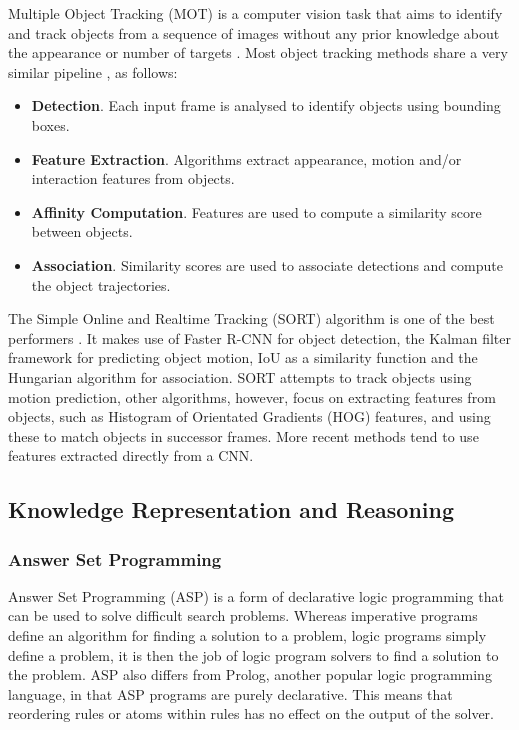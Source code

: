 \documentclass[../interim.tex]{subfiles}
\begin{document}
Multiple Object Tracking (MOT) is a computer vision task that aims to identify and track objects from a sequence of images without any prior knowledge about the appearance or number of targets \cite{obj-tracking-survey}. Most object tracking methods share a very similar pipeline \cite{obj-tracking-survey}, as follows:
\begin{itemize}
  \item \textbf{Detection}. Each input frame is analysed to identify objects using bounding boxes.

  \item \textbf{Feature Extraction}. Algorithms extract appearance, motion and/or interaction features from objects.

  \item \textbf{Affinity Computation}. Features are used to compute a similarity score between objects.

  \item \textbf{Association}. Similarity scores are used to associate detections and compute the object trajectories.
\end{itemize}

The Simple Online and Realtime Tracking (SORT) \cite{sort-obj-tracking} algorithm is one of the best performers \cite{obj-tracking-survey}. It makes use of Faster R-CNN for object detection, the Kalman filter \cite{kalman-filter} framework for predicting object motion, IoU as a similarity function and the Hungarian algorithm \cite{hungarian-algo} for association. SORT attempts to track objects using motion prediction, other algorithms, however, focus on extracting features from objects, such as Histogram of Orientated Gradients (HOG) \cite{hog-features} features, and using these to match objects in successor frames. More recent methods tend to use features extracted directly from a CNN.


\subsection{Knowledge Representation and Reasoning}

\subsubsection{Answer Set Programming}

Answer Set Programming (ASP) is a form of declarative logic programming that can be used to solve difficult search problems. Whereas imperative programs define an algorithm for finding a solution to a problem, logic programs simply define a problem, it is then the job of logic program solvers to find a solution to the problem. ASP also differs from Prolog, another popular logic programming language, in that ASP programs are purely declarative. This means that reordering rules or atoms within rules has no effect on the output of the solver\cite{asp-primer}.
\end{document}
